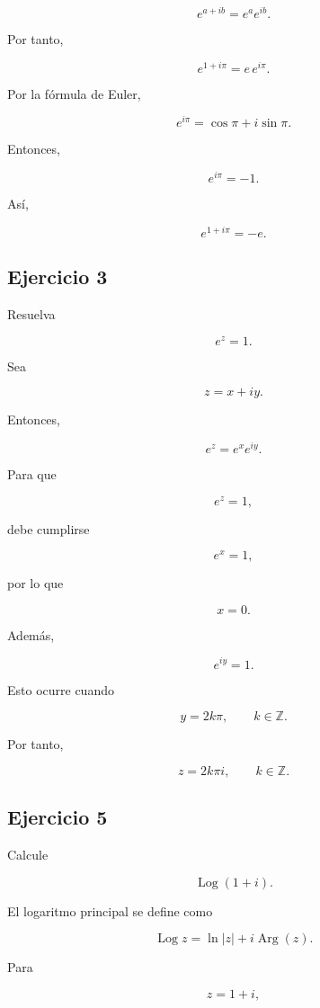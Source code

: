 \documentclass[12pt]{article}
\begin{document}
\[
e^{a+ib}
=
e^a e^{ib}.
\]

Por tanto,

\[
e^{1+i\pi}
=
e\,e^{i\pi}.
\]

Por la fórmula de Euler,

\[
e^{i\pi}
=
\cos\pi+i\sin\pi.
\]

Entonces,

\[
e^{i\pi}
=
-1.
\]

Así,

\[
\boxed{
e^{1+i\pi}=-e
}.
\]


\subsection*{Ejercicio 3}

Resuelva

\[
e^z=1.
\]

Sea

\[
z=x+iy.
\]

Entonces,

\[
e^z
=
e^xe^{iy}.
\]

Para que

\[
e^z=1,
\]

debe cumplirse

\[
e^x=1,
\]

por lo que

\[
x=0.
\]

Además,

\[
e^{iy}=1.
\]

Esto ocurre cuando

\[
y=2k\pi,
\qquad
k\in\mathbb Z.
\]

Por tanto,

\[
\boxed{
z=2k\pi i,
\qquad k\in\mathbb Z
}.
\]


\subsection*{Ejercicio 5}

Calcule

\[
\operatorname{Log}(1+i).
\]

El logaritmo principal se define como

\[
\operatorname{Log}z
=
\ln|z|+i\operatorname{Arg}(z).
\]

Para

\[
z=1+i,
\]
\end{document}
